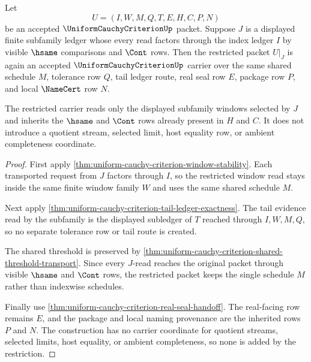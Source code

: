 \begin{theorem}
\label{thm:uniform-cauchy-criterion-subfamily-restriction}
Let
$$
U=(I,W,M,Q,T,E,H,C,P,N)
$$
be an accepted $\UniformCauchyCriterionUp$ packet. Suppose $J$ is a displayed
finite subfamily ledger whose every read factors through the index ledger $I$
by visible $\hsame$ comparisons and $\Cont$ rows. Then the restricted packet
$U|_J$ is again an accepted $\UniformCauchyCriterionUp$ carrier over the same
shared schedule $M$, tolerance row $Q$, tail ledger route, real seal row $E$,
package row $P$, and local $\NameCert$ row $N$.

The restricted carrier reads only the displayed subfamily windows selected by
$J$ and inherits the $\hsame$ and $\Cont$ rows already present in $H$ and $C$.
It does not introduce a quotient stream, selected limit, host equality row, or
ambient completeness coordinate.
\end{theorem}
\begin{proof}
First apply \autoref{thm:uniform-cauchy-criterion-window-stability}. Each
transported request from $J$ factors through $I$, so the restricted window
read stays inside the same finite window family $W$ and uses the same shared
schedule $M$.

Next apply
\autoref{thm:uniform-cauchy-criterion-tail-ledger-exactness}. The tail
evidence read by the subfamily is the displayed subledger of $T$ reached
through $I,W,M,Q$, so no separate tolerance row or tail route is created.

The shared threshold is preserved by
\autoref{thm:uniform-cauchy-criterion-shared-threshold-transport}. Since every
$J$-read reaches the original packet through visible $\hsame$ and $\Cont$
rows, the restricted packet keeps the single schedule $M$ rather than
indexwise schedules.

Finally use \autoref{thm:uniform-cauchy-criterion-real-seal-handoff}. The
real-facing row remains $E$, and the package and local naming provenance are
the inherited rows $P$ and $N$. The construction has no carrier coordinate for
quotient streams, selected limits, host equality, or ambient completeness, so
none is added by the restriction.
\end{proof}

